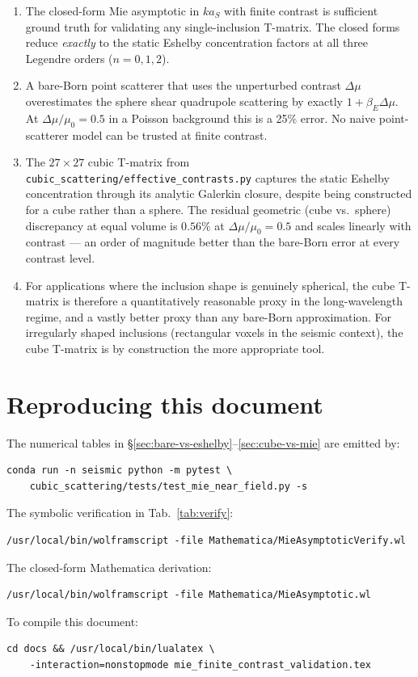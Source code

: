 \documentclass[11pt,a4paper]{article}
\newcommand{\D}{\Delta}
\newcommand{\code}[1]{\texttt{#1}}
\begin{document}
\begin{enumerate}[leftmargin=*]
\item The closed-form Mie asymptotic in $ka_S$ with finite contrast is
sufficient ground truth for validating any single-inclusion T-matrix.
The closed forms reduce \emph{exactly} to the static Eshelby
concentration factors at all three Legendre orders ($n=0,1,2$).

\item A bare-Born point scatterer that uses the unperturbed contrast
$\D\mu$ overestimates the sphere shear quadrupole scattering by exactly
$1+\beta_E\D\mu$.  At $\D\mu/\mu_0=0.5$ in a Poisson background this is
a 25\% error.  No naive point-scatterer model can be trusted at finite
contrast.

\item The $27\times 27$ cubic T-matrix from
\code{cubic\_scattering/effective\_contrasts.py} captures the static
Eshelby concentration through its analytic Galerkin closure, despite
being constructed for a cube rather than a sphere.  The residual
geometric (cube vs.~sphere) discrepancy at equal volume is $0.56\%$ at
$\D\mu/\mu_0=0.5$ and scales linearly with contrast --- an order of
magnitude better than the bare-Born error at every contrast level.

\item For applications where the inclusion shape is genuinely
spherical, the cube T-matrix is therefore a quantitatively reasonable
proxy in the long-wavelength regime, and a vastly better proxy than any
bare-Born approximation.  For irregularly shaped inclusions
(rectangular voxels in the seismic context), the cube T-matrix is by
construction the more appropriate tool.
\end{enumerate}

\section*{Reproducing this document}

The numerical tables in \S\ref{sec:bare-vs-eshelby}--\ref{sec:cube-vs-mie}
are emitted by:
\begin{verbatim}
conda run -n seismic python -m pytest \
    cubic_scattering/tests/test_mie_near_field.py -s
\end{verbatim}
The symbolic verification in Tab.~\ref{tab:verify}:
\begin{verbatim}
/usr/local/bin/wolframscript -file Mathematica/MieAsymptoticVerify.wl
\end{verbatim}
The closed-form Mathematica derivation:
\begin{verbatim}
/usr/local/bin/wolframscript -file Mathematica/MieAsymptotic.wl
\end{verbatim}

To compile this document:
\begin{verbatim}
cd docs && /usr/local/bin/lualatex \
    -interaction=nonstopmode mie_finite_contrast_validation.tex
\end{verbatim}
\end{document}
